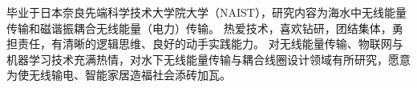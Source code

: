 

\begin{cvparagraph}

毕业于日本奈良先端科学技术大学院大学（NAIST），研究内容为海水中无线能量传输和磁谐振耦合无线能量（电力）传输。
热爱技术，喜欢钻研，团结集体，勇担责任，有清晰的逻辑思维、良好的动手实践能力。
对无线能量传输、物联网与机器学习技术充满热情，对水下无线能量传输与耦合线圈设计领域有所研究，愿意为使无线输电、智能家居造福社会添砖加瓦。



\end{cvparagraph}
